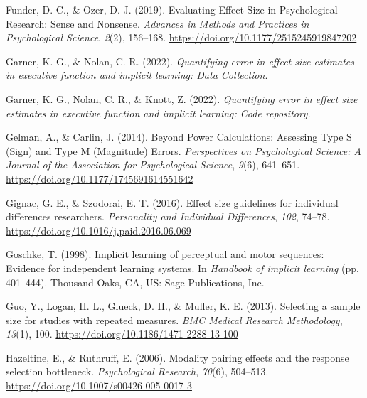 \documentclass[
  man]{apa6}
\newlength{\cslhangindent}
\newlength{\cslentryspacingunit} %
\newenvironment{CSLReferences}[2] %
 {%
  \setlength{\parindent}{0pt}
  \ifodd #1
  \let\oldpar\par
  \def\par{\hangindent=\cslhangindent\oldpar}
  \fi
  \setlength{\parskip}{#2\cslentryspacingunit}
 }%
 {}
\begin{document}
\begin{CSLReferences}{1}{0}
\leavevmode{}%
Funder, D. C., \& Ozer, D. J. (2019). Evaluating {Effect Size} in {Psychological Research}: {Sense} and {Nonsense}. \emph{Advances in Methods and Practices in Psychological Science}, \emph{2}(2), 156--168. \url{https://doi.org/10.1177/2515245919847202}

\leavevmode{}%
Garner, K. G., \& Nolan, C. R. (2022). \emph{Quantifying error in effect size estimates in executive function and implicit learning: {Data Collection}}.

\leavevmode{}%
Garner, K. G., Nolan, C. R., \& Knott, Z. (2022). \emph{Quantifying error in effect size estimates in executive function and implicit learning: {Code} repository}.

\leavevmode{}%
Gelman, A., \& Carlin, J. (2014). Beyond {Power Calculations}: {Assessing Type S} ({Sign}) and {Type M} ({Magnitude}) {Errors}. \emph{Perspectives on Psychological Science: A Journal of the Association for Psychological Science}, \emph{9}(6), 641--651. \url{https://doi.org/10.1177/1745691614551642}

\leavevmode{}%
Gignac, G. E., \& Szodorai, E. T. (2016). Effect size guidelines for individual differences researchers. \emph{Personality and Individual Differences}, \emph{102}, 74--78. \url{https://doi.org/10.1016/j.paid.2016.06.069}

\leavevmode{}%
Goschke, T. (1998). Implicit learning of perceptual and motor sequences: {Evidence} for independent learning systems. In \emph{Handbook of implicit learning} (pp. 401--444). {Thousand Oaks, CA, US}: {Sage Publications, Inc}.

\leavevmode{}%
Guo, Y., Logan, H. L., Glueck, D. H., \& Muller, K. E. (2013). Selecting a sample size for studies with repeated measures. \emph{BMC Medical Research Methodology}, \emph{13}(1), 100. \url{https://doi.org/10.1186/1471-2288-13-100}

\leavevmode{}%
Hazeltine, E., \& Ruthruff, E. (2006). Modality pairing effects and the response selection bottleneck. \emph{Psychological Research}, \emph{70}(6), 504--513. \url{https://doi.org/10.1007/s00426-005-0017-3}


\end{CSLReferences}
\end{document}
